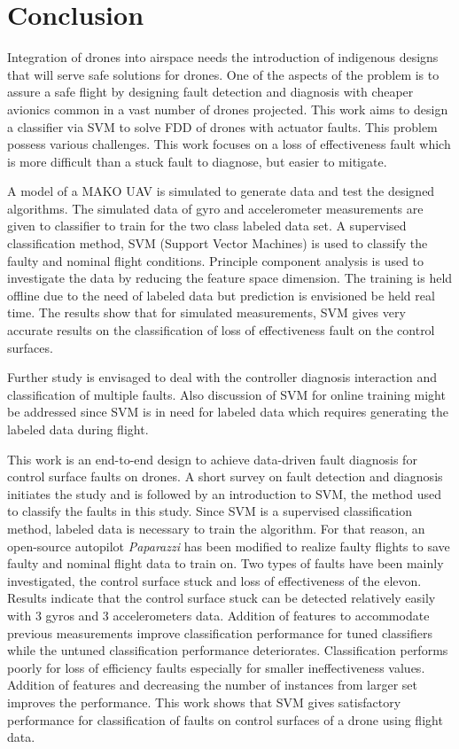 \chapter{Conclusion}


Integration of drones into airspace needs the introduction of indigenous designs that will serve safe solutions for drones. One of the aspects of the problem is to assure a safe flight by designing fault detection and diagnosis with cheaper avionics common in a vast number of drones projected.
This work aims to design a classifier via SVM to solve FDD of drones with actuator faults. This problem possess various challenges. This work focuses on a loss of effectiveness fault which is more difficult than a stuck fault to diagnose, but easier to mitigate. 

A model of a MAKO UAV is simulated to generate data and test the designed algorithms. The simulated data of gyro and accelerometer measurements are given to classifier to train for the two class labeled data set. A supervised classification method, SVM (Support Vector Machines) is used to classify the faulty and nominal flight conditions. Principle component analysis is used to investigate the data by reducing the feature space dimension. The training is held offline due to the need of labeled data but prediction is envisioned be held real time. The results show that for simulated measurements, SVM gives very accurate results on the classification of loss of effectiveness fault on the control surfaces.

Further study is envisaged to deal with the controller diagnosis interaction and classification of multiple faults. Also discussion of SVM for online training might be addressed since SVM is in need for labeled data which requires generating the labeled data during flight. 



This work is an end-to-end design to achieve data-driven fault diagnosis for control surface faults on drones. A short survey on fault detection and diagnosis initiates the study and is followed by an introduction to SVM, the method used to classify the faults in this study. Since SVM is a supervised classification method, labeled data is necessary to train the algorithm. For that reason, an open-source autopilot \emph{Paparazzi} has been modified to realize faulty flights to save faulty and nominal flight data to train on. Two types of faults have been mainly investigated, the control surface stuck and loss of effectiveness of the elevon. Results indicate that the control surface stuck can be detected relatively easily with 3 gyros and 3 accelerometers data. Addition of features to accommodate previous measurements improve classification performance for tuned classifiers while the untuned classification performance deteriorates. Classification performs poorly for loss of efficiency faults especially for smaller ineffectiveness values. Addition of features and decreasing the number of instances from larger set improves the performance. This work shows that SVM gives satisfactory performance for classification of faults on control surfaces of a drone using flight data.